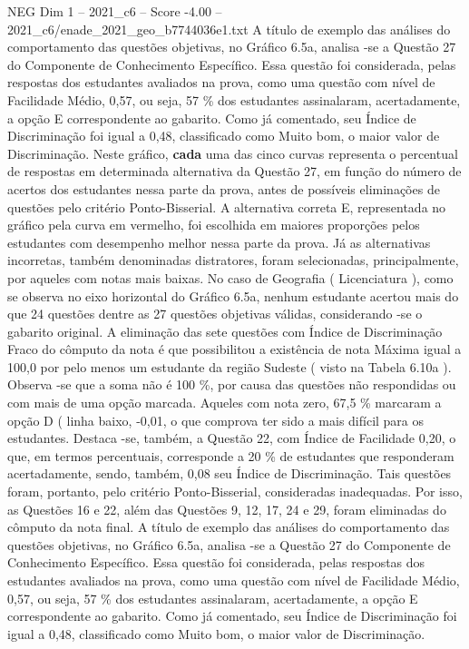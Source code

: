 \begin{textsample}{NEG Dim 1 – 2021\_c6 – Score -4.00 – 2021\_c6/enade\_2021\_geo\_b7744036e1.txt}
A título de exemplo das análises do comportamento das questões objetivas, no Gráfico 6.5a, analisa -se a Questão 27 do Componente de Conhecimento Específico.
Essa questão foi considerada, pelas respostas dos estudantes avaliados na prova, como uma questão com nível de Facilidade Médio, 0,57, ou seja, 57 \% dos estudantes assinalaram, acertadamente, a opção E correspondente ao gabarito.
Como já comentado, seu Índice de Discriminação foi igual a 0,48, classificado como Muito bom, o maior valor de Discriminação.
Neste gráfico, \textbf{cada} uma das cinco curvas representa o percentual de respostas em determinada alternativa da Questão 27, em função do número de acertos dos estudantes nessa parte da prova, antes de possíveis eliminações de questões pelo critério Ponto-Bisserial.
A alternativa correta E, representada no gráfico pela curva em vermelho, foi escolhida em maiores proporções pelos estudantes com desempenho melhor nessa parte da prova.
Já as alternativas incorretas, também denominadas distratores, foram selecionadas, principalmente, por aqueles com notas mais baixas.
No caso de Geografia ( Licenciatura ), como se observa no eixo horizontal do Gráfico 6.5a, nenhum estudante acertou mais do que 24 questões dentre as 27 questões objetivas válidas, considerando -se o gabarito original.
A eliminação das sete questões com Índice de Discriminação Fraco do cômputo da nota é que possibilitou a existência de nota Máxima igual a 100,0 por pelo menos um estudante da região Sudeste ( visto na Tabela 6.10a ).
Observa -se que a soma não é 100 \%, por causa das questões não respondidas ou com mais de uma opção marcada.
Aqueles com nota zero, 67,5 \% marcaram a opção D ( linha baixo, -0,01, o que comprova ter sido a mais difícil para os estudantes.
Destaca -se, também, a Questão 22, com Índice de Facilidade 0,20, o que, em termos percentuais, corresponde a 20 \% de estudantes que responderam acertadamente, sendo, também, 0,08 seu Índice de Discriminação.
Tais questões foram, portanto, pelo critério Ponto-Bisserial, consideradas inadequadas.
Por isso, as Questões 16 e 22, além das Questões 9, 12, 17, 24 e 29, foram eliminadas do cômputo da nota final.
A título de exemplo das análises do comportamento das questões objetivas, no Gráfico 6.5a, analisa -se a Questão 27 do Componente de Conhecimento Específico.
Essa questão foi considerada, pelas respostas dos estudantes avaliados na prova, como uma questão com nível de Facilidade Médio, 0,57, ou seja, 57 \% dos estudantes assinalaram, acertadamente, a opção E correspondente ao gabarito.
Como já comentado, seu Índice de Discriminação foi igual a 0,48, classificado como Muito bom, o maior valor de Discriminação.

\end{textsample}
